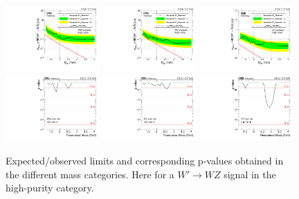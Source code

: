 \begin{figure}[h!]
\centering
\includegraphics[width=0.32\textwidth]{figures/analysis/search1/AN-15-211/limits/brazilianFlag_WZ_WWHP_13TeV_wPDF.pdf}
\includegraphics[width=0.32\textwidth]{figures/analysis/search1/AN-15-211/limits/brazilianFlag_WZ_WZHP_13TeV_wPDF.pdf}
\includegraphics[width=0.32\textwidth]{figures/analysis/search1/AN-15-211/limits/brazilianFlag_WZ_ZZHP_13TeV_wPDF.pdf}\\
\includegraphics[width=0.32\textwidth]{figures/analysis/search1/AN-15-211/pvalues/pvalue_WZinWW_high_purity.pdf}
\includegraphics[width=0.32\textwidth]{figures/analysis/search1/AN-15-211/pvalues/pvalue_WZinWZ_high_purity.pdf}
\includegraphics[width=0.32\textwidth]{figures/analysis/search1/AN-15-211/pvalues/pvalue_WZinZZ_high_purity.pdf}
\caption{Expected/observed limits and corresponding p-values obtained in the different mass categories. Here for a $W'\rightarrow WZ$ signal in the high-purity category.}
\label{fig:searchI:Limits_HPWZ}
\end{figure}

